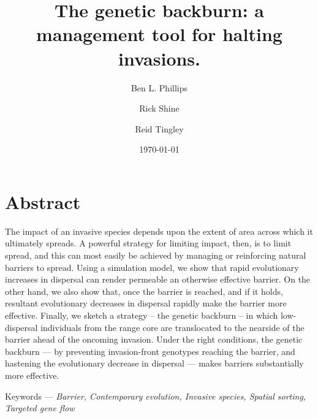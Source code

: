 \documentclass{article}
\begin{document}
\title{The genetic backburn: a management tool for halting invasions.}

\author{Ben L. Phillips}

  
\author{Rick Shine}
  
\author{Reid Tingley}
  


\date{\today}



\maketitle 


\newpage
\linenumbers

\section{Abstract}
The impact of an invasive species depends upon the extent of area across which it ultimately spreads.  A powerful strategy for limiting impact, then, is to limit spread, and this can most easily be achieved by managing or reinforcing natural barriers to spread.  Using a simulation model, we show that rapid evolutionary increases in dispersal can render permeable an otherwise effective barrier.  On the other hand, we also show that, once the barrier is reached, and if it holds, resultant evolutionary decreases in dispersal rapidly make the barrier more effective.  Finally, we sketch a strategy -- the genetic backburn -- in which low-dispersal individuals from the range core are translocated to the nearside of the barrier ahead of the oncoming invasion.  Under the right conditions, the genetic backburn --- by preventing invasion-front genotypes reaching the barrier, and hastening the evolutionary decrease in dispersal --- makes barriers substantially more effective.

\bigskip

Keywords --- \emph{Barrier, Contemporary evolution, Invasive species, Spatial sorting, Targeted gene flow}


    
\newpage
\end{document}
